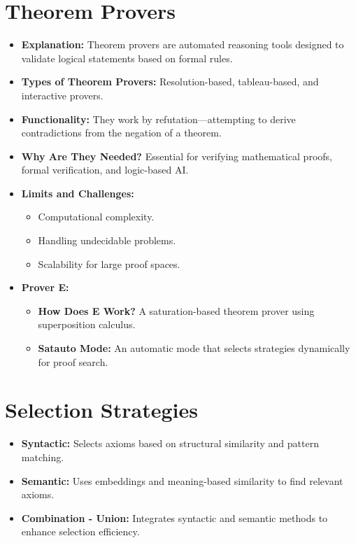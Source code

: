 \documentclass[english,version-2020-11]{uzl-thesis}
\begin{document}
  \section{Theorem Provers}
    \begin{itemize}
        \item \textbf{Explanation:} Theorem provers are automated reasoning tools designed to validate logical statements based on formal rules.
        \item \textbf{Types of Theorem Provers:} Resolution-based, tableau-based, and interactive provers.
        \item \textbf{Functionality:} They work by refutation—attempting to derive contradictions from the negation of a theorem.
        \item \textbf{Why Are They Needed?} Essential for verifying mathematical proofs, formal verification, and logic-based AI.
        \item \textbf{Limits and Challenges:}
        \begin{itemize}
            \item Computational complexity.
            \item Handling undecidable problems.
            \item Scalability for large proof spaces.
        \end{itemize}
        \item \textbf{Prover E:}
        \begin{itemize}
            \item \textbf{How Does E Work?} A saturation-based theorem prover using superposition calculus.
            \item \textbf{Satauto Mode:} An automatic mode that selects strategies dynamically for proof search.
        \end{itemize}
    \end{itemize}

  \section{Selection Strategies}
    \begin{itemize}
        \item \textbf{Syntactic:} Selects axioms based on structural similarity and pattern matching.
        \item \textbf{Semantic:} Uses embeddings and meaning-based similarity to find relevant axioms.
        \item \textbf{Combination - Union:} Integrates syntactic and semantic methods to enhance selection efficiency.
    \end{itemize}
\end{document}
